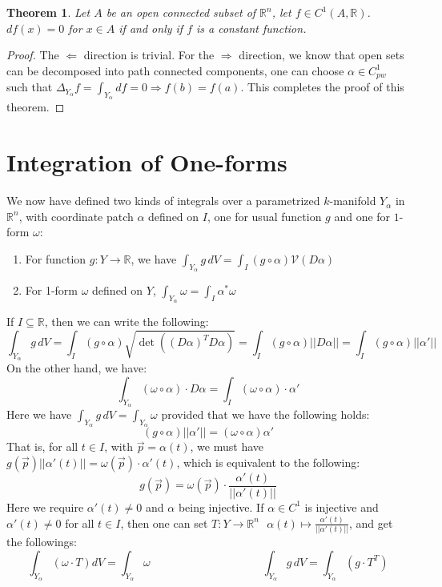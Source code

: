\documentclass[15pt]{book}
\theoremstyle{break}
\theoremstyle{break}
\newtheorem{thm}{Theorem}[section]
\newcommand{\R}{\mathbb{R}}
\begin{document}
\begin{thm}
Let $A$ be an open connected subset of $\R^n$, let $f \in C^1(A,\R)$. $df(x) = 0$ for $x \in A$ if and only if $f$ is a constant function. 
\end{thm}
\begin{proof}
The $\Leftarrow$ direction is trivial. For the $\Rightarrow$ direction, we know that open sets can be decomposed into path connected components, one can choose $\alpha\in C^1_{pw}$ such that $\Delta_{Y_\alpha} f = \int_{Y_\alpha} df = 0 \Rightarrow f(b) = f(a)$. This completes the proof of this theorem.
\end{proof}

\newpage
\section[Integration of One-forms]{\color{red}Integration of One-forms \color{black}}
We now have defined two kinds of integrals over a parametrized $k$-manifold $Y_\alpha$ in $\R^n$, with coordinate patch $\alpha$ defined on $I$, one for usual function $g$ and one for $1$-form $\omega$:
\begin{enumerate}[topsep=3pt,itemsep=-1ex,partopsep=1ex,parsep=1ex]
\item For function $g:Y\to \R$, we have $\int_{Y_\alpha} g\, dV = \int_I (g\circ \alpha)\mathcal{V}(D\alpha)$
\item For 1-form $\omega$ defined on $Y$, $\int_{Y_\alpha} \omega = \int_{I} \alpha^*\omega$
\end{enumerate}
If $I \subseteq \R$, then we can write the following:
$$\int_{Y_{\alpha}} g\, dV = \int_I (g\circ \alpha) \sqrt{\det((D\alpha)^TD\alpha)} = \int_I (g\circ \alpha) ||D\alpha|| = \int_I (g\circ \alpha) ||\alpha'||$$
On the other hand, we have:
$$\int_{Y_\alpha} (\omega \circ \alpha) \cdot D\alpha= \int_I (\omega \circ \alpha) \cdot \alpha'$$
Here we have $\int_{Y_\alpha} g\, dV  = \int_{Y_\alpha} \omega$ provided that we have the following holds:
$$(g\circ \alpha)||\alpha'|| = (\omega \circ \alpha) \alpha'$$
That is, for all $t\in I$, with $\vec{p} = \alpha(t)$, we must have $g(\vec{p})||\alpha'(t)|| = \omega(\vec{p})\cdot \alpha'(t)$, which is equivalent to the following:
$$g(\vec{p}) = \omega(\vec{p}) \cdot \frac{\alpha'(t)}{||\alpha'(t)||}$$
Here we require $\alpha'(t) \neq 0$ and $\alpha$ being injective. If $\alpha\in C^1$ is injective and $\alpha'(t)\neq 0$ for all $t \in I$, then one can set $T:Y \to \R^n \ \ \ \alpha(t)\mapsto \frac{\alpha'(t)}{||\alpha'(t)||}$, and get the followings:
$$\int_{Y_{\alpha}} (\omega \cdot T)dV = \int_{Y_\alpha}\omega \qquad\qquad\qquad\qquad\qquad\int_{Y_{\alpha}} g\, dV = \int_{Y_\alpha} (g\cdot T^T)$$
\hfill\break
\end{document}
